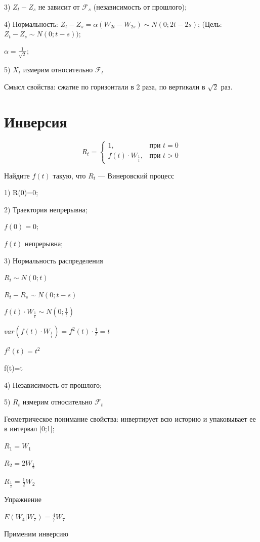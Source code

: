 \documentclass[a4paper]{article}
\begin{document}
3) $Z_t-Z_s$ не зависит от $\mathcal{F}_s$ (независимость от прошлого);

4) Нормальность: $Z_t-Z_s= \alpha (W_{2t} - W_{2s}) \sim N(0;2t-2s)$; (Цель: $Z_t-Z_s \sim N(0; t-s))$;

$\alpha = \frac{1}{\sqrt{2}}$;

5) $X_t$ измерим относительно $\mathcal{F}_t$

Смысл свойства: сжатие по горизонтали в 2 раза, по вертикали в $\sqrt{2}$ раз.

\section*{Инверсия}

\begin{equation*}
R_t =
 \begin{cases}
   1, &\text{при } t=0 \\
   f(t)\cdot W_\frac{1}{t}, &\text{при } t>0
 \end{cases}
\end{equation*}

Найдите $f(t)$ такую, что $R_t$ — Винеровский процесс

1) R(0)=0;

2) Траектория непрерывна;

$f(0)=0$;

$f(t)$ непрерывна;

3) Нормальность распределения

$R_t\sim N (0;t)$

$R_t-R_s \sim N (0;t-s)$

$f(t)\cdot W_\frac{1}{t} \sim N (0;\frac{1}{t})$

$var(f(t)\cdot W_\frac{1}{t})=f^2(t)\cdot \frac{1}{t}=t$

$f^2(t)=t^2$

f(t)=t

4) Независимость от прошлого;

5) $R_t$ измерим относительно $\mathcal{F}_t$

Геометрическое понимание свойства: инвертирует всю историю и упаковывает ее в интервал [0;1];

$R_1=W_1$

$R_2=2W_\frac{1}{2}$

$R_\frac{1}{2}=\frac{1}{2}W_2$

Упражнение

$E(W_4|W_7)=\frac{4}{7}W_7$

Применим инверсию
\end{document}
